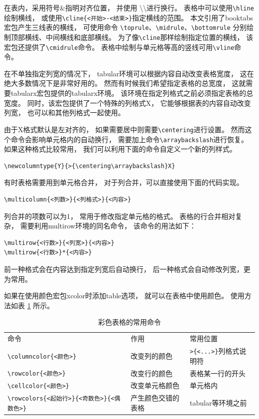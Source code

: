 \documentclass{ctexart}
\numberwithin{equation}{section}			%
\begin{document}
	在表内，采用符号\&指明对齐位置，
	并使用 \textbackslash\textbackslash 进行换行。
	表格中可以使用\verb|\hline|绘制横线，
	或使用\verb|\cline{<开始>-<结束>}|指定横线的范围。
	本文引用了booktabs宏包产生三线表的横线，
	可使用命令
	\verb|\toprule|、\verb|\midrule|、\verb|\bottomrule|
	分别绘制顶部横线、中间横线和底部横线。
	为了像\verb|\cline|那样绘制指定位置的横线，
	该宏包还提供了\verb|\cmidrule|命令。
	表格中绘制与单元格等高的竖线可用\verb|\vline|命令。
	
	在不单独指定列宽的情况下，
	tabular环境可以根据内容自动改变表格宽度，
	这在绝大多数情况下是非常好用的。
	然而有时候我们希望指定表格的总宽度，
	这就需要tabularx宏包提供的tabularx环境。
	该环境在指定列格式之前必须指定表格的总宽度。
	同时，该宏包提供了一个特殊的列格式X，
	它能够根据表的内容自动改变列宽，
	也可以和其他列格式一起使用。
	
	由于X格式默认是左对齐的，
	如果需要居中则需要\verb|\centering|进行设置。
	然而这个命令会影响单元格内的自动换行，
	需要加上命令\verb|\arraybackslash|进行恢复。
	如果这种格式比较常用，
	我们可以利用下面的命令自定义一个新的列样式。
	
\begin{lstlisting}
\newcolumntype{Y}{>{\centering\arraybackslash}X}
\end{lstlisting}
	
	有时表格需要用到单元格合并，
	对于列合并，可以直接使用下面的代码实现。

\begin{lstlisting}
\multicolumn{<列数>}{<列格式>}{<内容>}
\end{lstlisting}

	列合并的项数可以为1，
	常用于修改指定单元格的格式。
	表格的行合并相对复杂，
	需要利用multirow环境的同名命令，
	该命令的用法如下：
	
\begin{lstlisting}
\multirow{<行数>}{<列宽>}{<内容>}
\multirow{<行数>}*{<内容>}
\end{lstlisting}
	
	前一种格式会在内容达到指定列宽后自动换行，
	后一种格式会自动修改列宽，更为常用。
	
	如果在使用颜色宏包xcolor时添加table选项，
	就可以在表格中使用颜色。
	使用方法如表 \ref{tab:tabcolor} 所示。
	
	\begin{table}[hbp]
		\centering
		\caption{彩色表格的常用命令}
		\label{tab:tabcolor}
		\begin{tabular}{lll}
			命令 & 作用 & 常用位置 \\
			\verb|\columncolor{<颜色>}| & 改变列的颜色
				& \verb|>{<...>}|列格式说明符 \\
			\verb|\rowcolor{<颜色>}| &  改变行的颜色
				& 表格某一行的开头 \\
			\verb|\cellcolor{<颜色>}| & 改变单元格颜色
				& 单元格内 \\
			\verb|\rowcolors{<起始行>}{<奇数色>}{<偶数色>}|
				& 产生颜色交错的表格 & tabular等环境之前 \\
		\end{tabular}
	\end{table}
	
\end{document}
